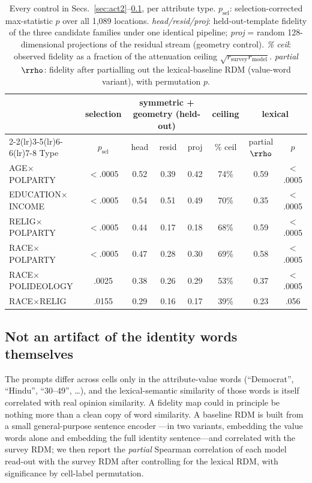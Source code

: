 \begin{table}[t]
\centering\footnotesize
\setlength{\tabcolsep}{4pt}
\caption{Every control in Secs.~\ref{sec:act2}--\ref{sec:lexical}, per
attribute type. \emph{$p_{\text{sel}}$}: selection-corrected
max-statistic $p$ over all 1{,}089 locations. \emph{head/resid/proj}:
held-out-template fidelity of the three candidate families under one
identical pipeline; \emph{proj} = random 128-dimensional projections of
the residual stream (geometry control).
\emph{\% ceil}: observed \starhead{} fidelity as a fraction
of the attenuation ceiling $\sqrt{r_{\text{survey}}r_{\text{model}}}$.
\emph{partial $\rrho$}: \starhead{} fidelity after partialling out the
lexical-baseline RDM (value-word variant), with permutation $p$.}
\label{tab:controls}
\begin{tabular}{lccccccc}
\toprule
& \multicolumn{1}{c}{selection} & \multicolumn{3}{c}{symmetric + geometry (held-out)}
& \multicolumn{1}{c}{ceiling} & \multicolumn{2}{c}{lexical}\\
\cmidrule(lr){2-2}\cmidrule(lr){3-5}\cmidrule(lr){6-6}\cmidrule(lr){7-8}
Type & $p_{\text{sel}}$ & head & resid & proj & \% ceil & partial $\rrho$ & $p$\\
\midrule
AGE$\times$POLPARTY & $<$.0005 & 0.52 & 0.39 & 0.42 & 74\% & 0.59 & $<$.0005 \\
EDUCATION$\times$INCOME & $<$.0005 & 0.54 & 0.51 & 0.49 & 70\% & 0.35 & $<$.0005 \\
RELIG$\times$POLPARTY & $<$.0005 & 0.44 & 0.17 & 0.18 & 68\% & 0.59 & $<$.0005 \\
RACE$\times$POLPARTY & $<$.0005 & 0.47 & 0.28 & 0.30 & 69\% & 0.58 & $<$.0005 \\
RACE$\times$POLIDEOLOGY & .0025 & 0.38 & 0.26 & 0.29 & 53\% & 0.37 & $<$.0005 \\
RACE$\times$RELIG & .0155 & 0.29 & 0.16 & 0.17 & 39\% & 0.23 & .056 \\
\bottomrule
\end{tabular}
\end{table}

\subsection{Not an artifact of the identity words themselves}
\label{sec:lexical}
The prompts differ across cells only in the attribute-value words
(``Democrat'', ``Hindu'', ``30--49'', \dots), and the lexical-semantic
similarity of those words is itself correlated with real opinion
similarity. A fidelity map could in principle be nothing more than a
clean copy of word similarity. A baseline RDM is
built from a small general-purpose sentence encoder
\citep{minilm2020}---in two variants, embedding the value words alone and
embedding the full identity sentence---and correlated with the survey
RDM; we then report the \emph{partial} Spearman correlation of each model
read-out with the survey RDM after controlling for the lexical RDM, with
significance by cell-label permutation.

